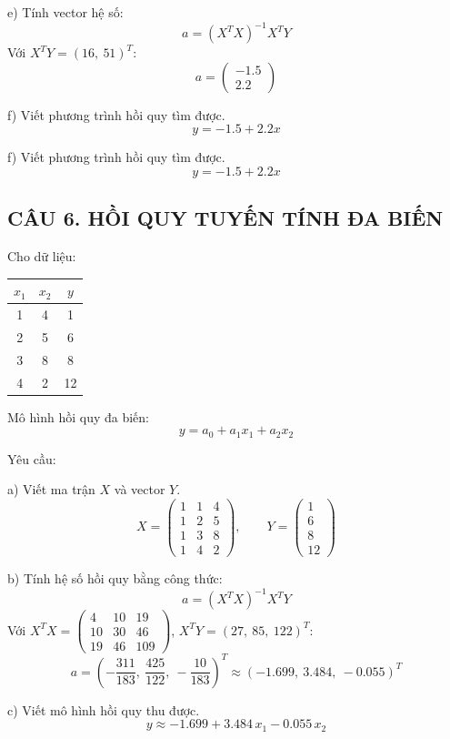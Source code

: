 \documentclass[a4paper,12pt]{article}
\begin{document}
e) Tính vector hệ số:
\[ a = (X^T X)^{-1} X^T Y \]
Với $X^T Y = (16,\ 51)^T$:
\[ a = \begin{pmatrix} -1.5 \\ 2.2 \end{pmatrix} \]

f) Viết phương trình hồi quy tìm được.
\[ y = -1.5 + 2.2x \]

f) Viết phương trình hồi quy tìm được.
\[ y = -1.5 + 2.2x \]

\subsection*{CÂU 6. HỒI QUY TUYẾN TÍNH ĐA BIẾN}

Cho dữ liệu:
\begin{center}
\begin{tabular}{|c|c|c|}
\hline
$x_1$ & $x_2$ & $y$ \\
\hline
1 & 4 & 1 \\
2 & 5 & 6 \\
3 & 8 & 8 \\
4 & 2 & 12 \\
\hline
\end{tabular}
\end{center}

Mô hình hồi quy đa biến:
\[ y = a_0 + a_1 x_1 + a_2 x_2 \]

Yêu cầu:

a) Viết ma trận $X$ và vector $Y$.
\[ X = \begin{pmatrix}
1 & 1 & 4 \\
1 & 2 & 5 \\
1 & 3 & 8 \\
1 & 4 & 2
\end{pmatrix}, \qquad
Y = \begin{pmatrix} 1 \\ 6 \\ 8 \\ 12 \end{pmatrix} \]

b) Tính hệ số hồi quy bằng công thức:
\[ a = (X^T X)^{-1} X^T Y \]
Với $X^T X = \begin{pmatrix} 4 & 10 & 19 \\ 10 & 30 & 46 \\ 19 & 46 & 109 \end{pmatrix}$,
$X^T Y = (27,\ 85,\ 122)^T$:
\[ a = \left(-\frac{311}{183},\ \frac{425}{122},\ -\frac{10}{183}\right)^T \approx (-1.699,\ 3.484,\ -0.055)^T \]

c) Viết mô hình hồi quy thu được.
\[ y \approx -1.699 + 3.484\,x_1 - 0.055\,x_2 \]
\end{document}
